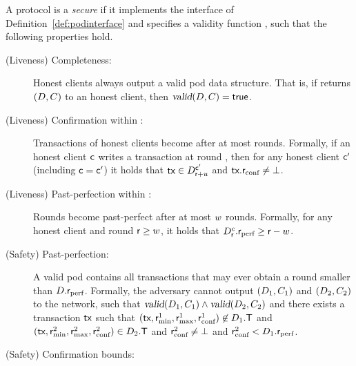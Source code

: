 \begin{definition}\label{def:podsec}
A protocol is a \emph{secure} \podtm if it implements the \podtm interface of Definition~\ref{def:podinterface} and specifies a validity function \opValid{}, such that the following properties hold.
\begin{description}
    \item[(Liveness) Completeness:]
    Honest clients always output a valid pod data structure.
    That is, if \opread{} returns $(\Pod, \cert)$ to an honest client, then $\opValid{\Pod, \cert} = \true$.

    \item[(Liveness) Confirmation within \parConf:]
	Transactions of honest clients become \confirmed after at most \parConf rounds.
	Formally, if an honest client $\client$ writes a transaction \tx at round \round,
    then for any honest client $\client'$ (including $\client=\client'$) it holds that $\tx \in \podView{\client'}{\round + \parConf}$ and $\tx.\rconf \neq \bot$.


	\item[(Liveness) Past-perfection within \parPerf:]
	Rounds become past-perfect after at most $\parPerf$ rounds.
	Formally,
    for any honest client \client and round $\round \geq \parPerf$, it holds that $\podView{c}{\round}.\rperf \geq \round - \parPerf$.

	\item[(Safety) Past-perfection:]
    A valid pod \Pod contains all transactions that may ever obtain a \confirmed round smaller than $\Pod.\rperf$. Formally,
	the adversary cannot output $(\Pod_1, \cert_1)$ and $(\Pod_2, \cert_2)$ to the network, such that $\opValid{\Pod_1, \cert_1} \land \opValid{\Pod_2, \cert_2}$ and there exists a transaction $\tx$ such that $(\tx, \rmin^1, \rmax^1, \rconf^1) \not\in \Pod_1.\txSet$ and $(\tx, \rmin^2, \rmax^2, \rconf^2) \in \Pod_2.\txSet$ and $\rconf^2 \neq \bot$ and $\rconf^2 < \Pod_1.\rperf$.

	\item[(Safety) Confirmation bounds:]


\end{description}
\end{definition}
